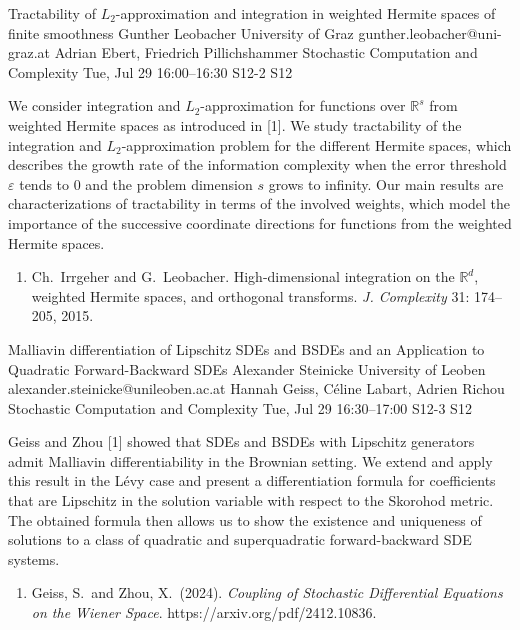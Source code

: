 \begin{talk}
  {Tractability of $L_2$-approximation and integration in weighted Hermite spaces of finite smoothness}%
  {Gunther Leobacher}%
  {University of Graz}%
  {gunther.leobacher@uni-graz.at}%
  {Adrian Ebert, Friedrich Pillichshammer}%
  {Stochastic Computation and Complexity}%
  {Tue, Jul 29 16:00--16:30}%
  {S12-2}%
  {S12}%
    
   

We consider integration and $L_2$-approximation for functions over $\mathbb R^s$ from weighted Hermite spaces as introduced in [1]. We study tractability of the integration and $L_2$-approximation problem for the different Hermite spaces, which describes the growth rate of the information complexity when the error threshold $\varepsilon$ tends to 0 and the problem dimension $s$ grows to infinity. Our main results are characterizations of tractability in terms of the involved weights, which  model the importance of the successive coordinate directions for functions from the weighted Hermite spaces.

\medskip

\begin{enumerate}
 \item[{[1]}] Ch.~Irrgeher and G.~Leobacher. High-dimensional integration on the $\mathbb R^d$, weighted Hermite spaces, and orthogonal transforms. \textit{J. Complexity} 31: 174--205, 2015. 
\end{enumerate}


\end{talk}

\begin{talk}
  {Malliavin differentiation of Lipschitz SDEs and BSDEs and an Application to Quadratic Forward-Backward SDEs}%
  {Alexander Steinicke}%
  {University of Leoben}%
  {alexander.steinicke@unileoben.ac.at}%
  {Hannah Geiss, C\'eline Labart, Adrien Richou}%
  {Stochastic Computation and Complexity}%
  {Tue, Jul 29 16:30--17:00}%
  {S12-3}%
  {S12}%
    
   
Geiss and Zhou [1] showed that SDEs and BSDEs with Lipschitz generators admit Malliavin differentiability in the Brownian setting. We extend and apply this result in the L\'evy case and present a differentiation formula for coefficients that are Lipschitz in the solution variable with respect to the Skorohod metric. The obtained formula then allows us to show the existence and uniqueness of solutions to a class of quadratic and superquadratic forward-backward SDE systems.

\medskip

\begin{enumerate}
 \item[{[1]}] Geiss, S.~and Zhou, X.~(2024). {\it Coupling of Stochastic Differential Equations on the Wiener Space}. https://arxiv.org/pdf/2412.10836.
\end{enumerate}

\end{talk}

